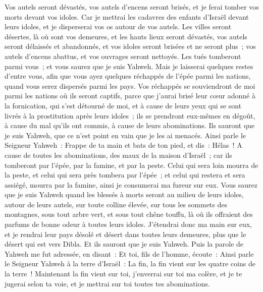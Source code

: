 \begin{multicols}{2}
Vos autels seront dévastés, vos autels d'encens seront brisés, et je ferai tomber vos morts devant vos idoles.
Car je mettrai les cadavres des enfants d'Israël devant leurs idoles, et je disperserai vos os autour de vos autels.
Les villes seront désertes, là où sont vos demeures, et les hauts lieux seront dévastés, vos autels seront délaissés et abandonnés, et vos idoles seront brisées et ne seront plus~; vos autels d'encens abattus, et vos ouvrages seront nettoyés.
Les tués tomberont parmi vous~; et vous saurez que je suis Yahweh.
Mais je laisserai quelques restes d'entre vous, afin que vous ayez quelques réchappés de l'épée parmi les nations, quand vous serez dispersés parmi les pays.
Vos réchappés se souviendront de moi parmi les nations où ils seront captifs, parce que j'aurai brisé leur cœur adonné à la fornication, qui s'est détourné de moi, et à cause de leurs yeux qui se sont livrés à la prostitution après leurs idoles~; ils se prendront eux-mêmes en dégoût, à cause du mal qu'ils ont commis, à cause de leurs abominations.
Ils sauront que je suis Yahweh, que ce n'est point en vain que je les ai menacés.
Ainsi parle le Seigneur Yahweh~: Frappe de ta main et bats de ton pied, et dis~: Hélas~! A cause de toutes les abominations, des maux de la maison d'Israël~; car ils tomberont par l'épée, par la famine, et par la peste.
Celui qui sera loin mourra de la peste, et celui qui sera près tombera par l'épée~; et celui qui restera et sera assiégé, mourra par la famine, ainsi je consumerai ma fureur sur eux.
Vous saurez que je suis Yahweh quand les blessés à morts seront au milieu de leurs idoles, autour de leurs autels, sur toute colline élevée, sur tous les sommets des montagnes, sous tout arbre vert, et sous tout chêne touffu, là où ils offraient des parfums de bonne odeur à toutes leurs idoles.
J'étendrai donc ma main sur eux, et je rendrai leur pays désolé et désert dans toutes leurs demeures, plus que le désert qui est vers Dibla. Et ils sauront que je suis Yahweh.
\VerseOne{}Puis la parole de Yahweh me fut adressée, en disant~:
Et toi, fils de l'homme, écoute~: Ainsi parle le Seigneur Yahweh à la terre d'Israël~: La fin, la fin vient sur les quatre coins de la terre~!
Maintenant la fin vient sur toi, j'enverrai sur toi ma colère, et je te jugerai selon ta voie, et je mettrai sur toi toutes tes abominations.

\end{multicols}
